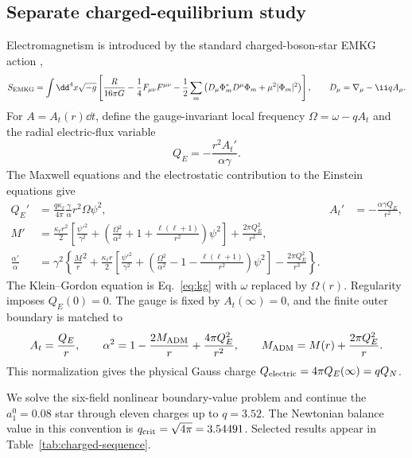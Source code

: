 \subsection{Separate charged-equilibrium study}
\label{sec:charged-extension}

Electromagnetism is introduced by the standard charged-boson-star EMKG action
\cite{JetzerVanDerBij1989,Pugliese2013,LopezAlcubierre2023},
\begin{equation}
S_{\rm EMKG}=\int\dd^4x\sqrt{-g}\left[
\frac{R}{16\pi G}-\frac14F_{\mu\nu}F^{\mu\nu}
-\frac12\sum_m\left(D_\mu\Phi_m^*D^\mu\Phi_m+
\mu^2|\Phi_m|^2\right)\right],
\qquad D_\mu=\nabla_\mu-\ii qA_\mu .
\label{eq:solved-emkg-action}
\end{equation}
For $A=A_t(r)\dd t$, define the gauge-invariant local frequency
$\Omega=\omega-qA_t$ and the radial electric-flux variable
\begin{equation}
Q_E=-\frac{r^2A_t'}{\alpha\gamma}.
\end{equation}
The Maxwell equations and the electrostatic contribution to the Einstein
equations give
\begin{align}
Q_E'&=\frac{q\kappa_\ell}{4\pi}\frac{\gamma}{\alpha}
r^2\Omega\psi^2,
&A_t'&=-\frac{\alpha\gamma Q_E}{r^2},\label{eq:charged-maxwell-pair}\\
M'&=\frac{\kappa_\ell r^2}{2}\left[
\frac{\psi'^2}{\gamma^2}+\left(\frac{\Omega^2}{\alpha^2}+
1+\frac{\ell(\ell+1)}{r^2}\right)\psi^2\right]
+\frac{2\pi Q_E^2}{r^2},\label{eq:charged-mass}\\
\frac{\alpha'}\alpha&=\gamma^2\left\{\frac Mr^2+
\frac{\kappa_\ell r}{2}\left[
\frac{\psi'^2}{\gamma^2}+\left(\frac{\Omega^2}{\alpha^2}-
1-\frac{\ell(\ell+1)}{r^2}\right)\psi^2\right]
-\frac{2\pi Q_E^2}{r^3}\right\}.
\label{eq:charged-lapse}
\end{align}
The Klein--Gordon equation is Eq.~\eqref{eq:kg} with $\omega$ replaced by
$\Omega(r)$.  Regularity imposes $Q_E(0)=0$.  The gauge is fixed by
$A_t(\infty)=0$, and the finite outer boundary is matched to
\begin{equation}
A_t=\frac{Q_E}{r},\qquad
\alpha^2=1-\frac{2M_{\rm ADM}}r+\frac{4\pi Q_E^2}{r^2},\qquad
M_{\rm ADM}=M(r)+\frac{2\pi Q_E^2}{r}.
\label{eq:rn-tail-convention}
\end{equation}
This normalization gives the physical Gauss charge
$Q_{\rm electric}=4\pi Q_E(\infty)=qQ_N$.

We solve the six-field nonlinear boundary-value problem and continue the
$a_1^0=0.08$ star through eleven charges up to $q=3.52$.  The Newtonian
balance value in this convention is $q_{\rm crit}=\sqrt{4\pi}=3.54491$.
Selected results appear in Table~\ref{tab:charged-sequence}.

